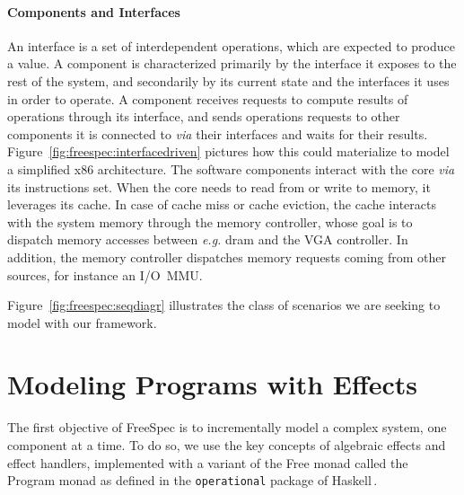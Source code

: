 \paragraph{Components and Interfaces}
%
An interface is a set of interdependent operations, which are expected to
produce a value.
%
A component is characterized primarily by the interface it exposes to the rest
of the system, and secondarily by its current state and the interfaces it uses
in order to operate.
%
A component receives requests to compute results of operations through its
interface, and sends operations requests to other components it is connected to
\emph{via} their interfaces and waits for their results.
%
Figure~\ref{fig:freespec:interfacedriven} pictures how this could materialize to
model a simplified x86 architecture.
%
The software components interact with the core \emph{via} its instructions set.
%
When the core needs to read from or write to memory, it leverages its cache.
%
In case of cache miss or cache eviction, the cache interacts with the system
memory through the memory controller, whose goal is to dispatch memory accesses
between \emph{e.g.} \ac{dram} and the VGA controller.
%
In addition, the memory controller dispatches memory requests coming from other
sources, for instance an I/O~MMU.

Figure~\ref{fig:freespec:seqdiagr} illustrates the class of scenarios we are
seeking to model with our framework.

\section{Modeling Programs with Effects}
\label{sec:freespec:specifying}

The first objective of FreeSpec is to incrementally model a complex system, one
component at a time.
%
To do so, we use the key concepts of algebraic effects and effect handlers,
implemented with a variant of the Free monad called the Program monad as defined
in the \texttt{operational} package of Haskell\,\cite{operational}.

